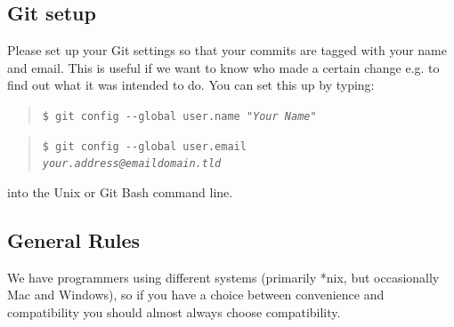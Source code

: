 \documentclass[12pt]{article}
\newcommand{\commandline}[1]{\begin{quotation}\texttt{\$ #1}\end{quotation}}
\newcommand{\clloption}[1]{-{}-#1}
\newcommand{\toreplace}[1]{\emph{#1}}
\begin{document}
\subsection{Git setup} Please set up your Git settings so that your commits are tagged with your name and email. This is useful if we want to know who made a certain change e.g. to find out what it was intended to do. You can set this up by typing:
        \commandline{git config \clloption{global} user.name "\toreplace{Your Name}"}
        \commandline{git config \clloption{global} user.email\\
        \toreplace{your.address@emaildomain.tld}}
into the Unix or Git Bash command line.

\subsection{General Rules} We have programmers using different systems (primarily *nix, but occasionally Mac and Windows), so if you have a choice between convenience and compatibility you should almost always choose compatibility.
\end{document}
